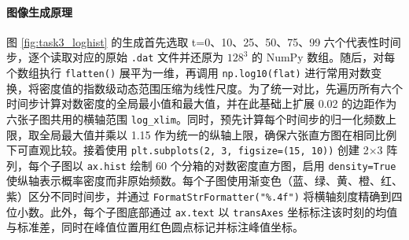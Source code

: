 \documentclass[12pt,a4paper]{article}
\begin{document}
\paragraph{图像生成原理}图 \ref{fig:task3_loghist} 的生成首先选取 t=0、10、25、50、75、99 六个代表性时间步，逐个读取对应的原始 \texttt{.dat} 文件并还原为 $128^3$ 的 NumPy 数组。随后，对每个数组执行 \texttt{flatten()} 展平为一维，再调用 \texttt{np.log10(flat)} 进行常用对数变换，将密度值的指数级动态范围压缩为线性尺度。为了统一对比，先遍历所有六个时间步计算对数密度的全局最小值和最大值，并在此基础上扩展 0.02 的边距作为六张子图共用的横轴范围 \texttt{log\_xlim}。同时，预先计算每个时间步的归一化频数上限，取全局最大值并乘以 1.15 作为统一的纵轴上限，确保六张直方图在相同比例下可直观比较。接着使用 \texttt{plt.subplots(2, 3, figsize=(15, 10))} 创建 2×3 阵列，每个子图以 \texttt{ax.hist} 绘制 60 个分箱的对数密度直方图，启用 \texttt{density=True} 使纵轴表示概率密度而非原始频数。每个子图使用渐变色（蓝、绿、黄、橙、红、紫）区分不同时间步，并通过 \texttt{FormatStrFormatter("\%.4f")} 将横轴刻度精确到四位小数。此外，每个子图底部通过 \texttt{ax.text} 以 \texttt{transAxes} 坐标标注该时刻的均值与标准差，同时在峰值位置用红色圆点标记并标注峰值坐标。
\end{document}
